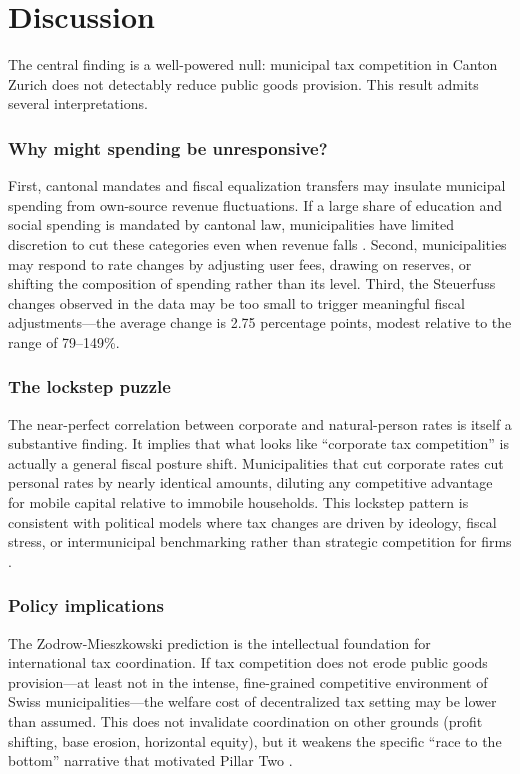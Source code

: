 \documentclass[12pt]{article}
\begin{document}



\section{Discussion}
\label{sec:discussion}

The central finding is a well-powered null: municipal tax competition in Canton Zurich does not detectably reduce public goods provision. This result admits several interpretations.

\subsubsection*{Why might spending be unresponsive?} First, cantonal mandates and fiscal equalization transfers may insulate municipal spending from own-source revenue fluctuations. If a large share of education and social spending is mandated by cantonal law, municipalities have limited discretion to cut these categories even when revenue falls \citep{ladner2013gemeinden}. Second, municipalities may respond to rate changes by adjusting user fees, drawing on reserves, or shifting the composition of spending rather than its level. Third, the Steuerfuss changes observed in the data may be too small to trigger meaningful fiscal adjustments---the average change is 2.75 percentage points, modest relative to the range of 79--149\%.

\subsubsection*{The lockstep puzzle} The near-perfect correlation between corporate and natural-person rates is itself a substantive finding. It implies that what looks like ``corporate tax competition'' is actually a general fiscal posture shift. Municipalities that cut corporate rates cut personal rates by nearly identical amounts, diluting any competitive advantage for mobile capital relative to immobile households. This lockstep pattern is consistent with political models where tax changes are driven by ideology, fiscal stress, or intermunicipal benchmarking rather than strategic competition for firms \citep{besley2001political, solezarza2010do}.

\subsubsection*{Policy implications} The Zodrow-Mieszkowski prediction is the intellectual foundation for international tax coordination. If tax competition does not erode public goods provision---at least not in the intense, fine-grained competitive environment of Swiss municipalities---the welfare cost of decentralized tax setting may be lower than assumed. This does not invalidate coordination on other grounds (profit shifting, base erosion, horizontal equity), but it weakens the specific ``race to the bottom'' narrative that motivated Pillar Two \citep{keen2001preferential, oecd2021pillar2}.
\end{document}
